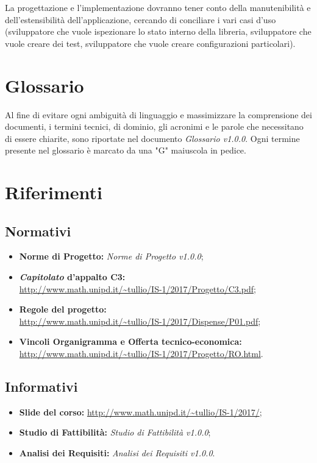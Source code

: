 \documentclass[./PianodiProgetto.tex]{subfiles}
\begin{document}
	\noindent La progettazione e l'implementazione dovranno tener conto della manutenibilità e dell'estensibilità dell'applicazione, cercando di conciliare i vari casi d'uso (sviluppatore che vuole ispezionare lo stato interno della libreria, sviluppatore che vuole creare dei test, sviluppatore che vuole creare configurazioni particolari). 
	
	\section{Glossario}
	Al fine di evitare ogni ambiguità di linguaggio e massimizzare la comprensione dei documenti, i termini tecnici, di dominio, gli acronimi e le parole che necessitano di essere chiarite, sono riportate nel documento \textit{Glossario v1.0.0}. Ogni termine presente nel glossario è marcato da una "G" maiuscola in pedice.
	
	\section{Riferimenti}
	
	\subsection{Normativi}
	\begin{itemize}
		\item \textbf{Norme di Progetto:} \textit{Norme di Progetto v1.0.0};
		\item \textbf{\textit{Capitolato} d'appalto C3:}\\ \url{http://www.math.unipd.it/~tullio/IS-1/2017/Progetto/C3.pdf};
		\item \textbf{Regole del progetto:}\\ \url{http://www.math.unipd.it/~tullio/IS-1/2017/Dispense/P01.pdf};
		\item \textbf{Vincoli Organigramma e Offerta tecnico-economica:}\\ \url{http://www.math.unipd.it/~tullio/IS-1/2017/Progetto/RO.html}.
	\end{itemize}
	
	\subsection{Informativi}
	\begin{itemize}
		\item \textbf{Slide del corso:} \url{http://www.math.unipd.it/~tullio/IS-1/2017/};
		\item \textbf{Studio di Fattibilità:} \textit{Studio di Fattibilità v1.0.0};
		\item \textbf{Analisi dei Requisiti:} \textit{Analisi dei Requisiti v1.0.0}.
	\end{itemize}
	
\end{document}
